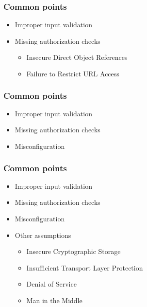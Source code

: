 \begin{frame}[t]
\vspace{2em}
\frametitle{Common points}
\begin{itemize}
\item Improper input validation
\pause
\item Missing authorization checks
	\pause
	\begin{itemize}
		\item<+-> Insecure Direct Object References
		\item<+-> Failure to Restrict URL Access
	\end{itemize}
\end{itemize}
\end{frame}

\begin{frame}[t]
\vspace{2em}
\frametitle{Common points}
\begin{itemize}
\item Improper input validation
\item Missing authorization checks
\pause
\item Misconfiguration
\end{itemize}
\end{frame}

\begin{frame}[t]
\vspace{2em}
\frametitle{Common points}
\begin{itemize}
\item Improper input validation
\item Missing authorization checks
\item Misconfiguration
\pause
\item Other assumptions
	\pause
	\begin{itemize}
		\item<+-> Insecure Cryptographic Storage
		\item<+-> Insufficient Transport Layer Protection
		\item<+-> Denial of Service
		\item<+-> Man in the Middle
	\end{itemize}
\end{itemize}
\end{frame}

